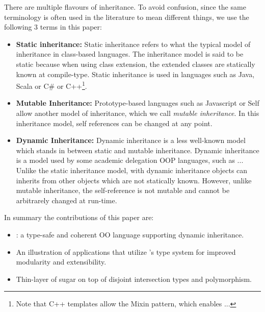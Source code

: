 There are multiple flavours of inheritance. To avoid confusion, since 
the same terminology is often used in the literature to mean different 
things, we use the following 3 terms in this paper:

\begin{itemize}



\item{{\bf Static inheritance:}} Static inheritance refers to what the
  typical model of inheritance in class-based languages. The
  inheritance model is said to be static because when using class
  extension, the extended classes are statically known at compile-type.
Static inheritance is used in languages such as Java, Scala or C\# or
C++\footnote{Note that C++ templates allow the Mixin pattern, which
  enables ...}.

\item{{\bf Mutable Inheritance:}} Prototype-based languages such as 
Javascript or Self allow another model of inheritance, which we call
\emph{mutable inheritance}. In this inheritance model, self references 
can be changed at any point. 

\item{{\bf Dynamic Inheritance:}} Dynamic inheritance is a less well-known 
model which stands in between static and mutable inheritance.
Dynamic inheritance is a model used by some academic delegation 
OOP languages, such as ...  
Unlike the static inheritance model, with dynamic inheritance 
objects can inherits from other objects which are not statically
known. However, unlike mutable inheritance, the self-reference is not 
mutable and cannot be arbitrarely changed at run-time. 

\end{itemize}

In summary the contributions of this paper are:

\begin{itemize}

\item \name: a type-safe and coherent OO language supporting dynamic
inheritance.

\item An illustration of applications that utilize \name's type system 
for improved modularity and extensibility.

\item Thin-layer of sugar on top of disjoint intersection types and
  polymorphism.

\end{itemize}